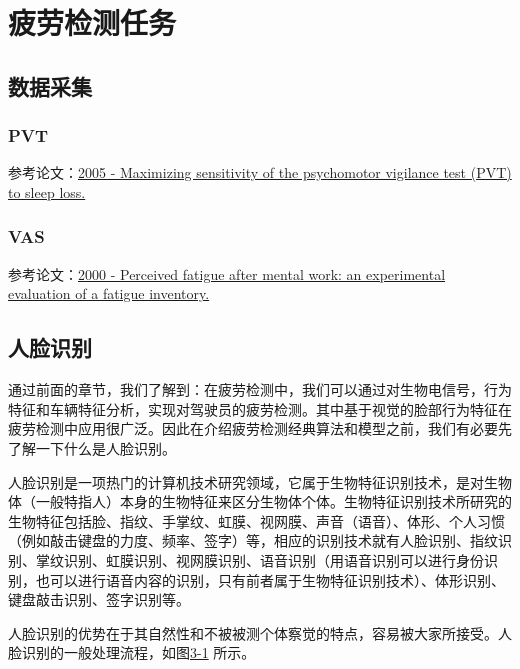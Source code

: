 \chapter{疲劳检测任务}

\section{数据采集}

\subsection{PVT}

参考论文：\href{https://xueshu.baidu.com/usercenter/paper/show?paperid=430fa0094230e7e14ad6ff778e61ebc6&site=xueshu_se&hitarticle=1}{2005 - Maximizing sensitivity of the psychomotor vigilance test (PVT) to sleep loss.}

\subsection{VAS}

参考论文：\href{https://xueshu.baidu.com/usercenter/paper/show?paperid=e67a15e52d71a9730b1205d21f73b239&site=xueshu_se}{2000 - Perceived fatigue after mental work: an experimental evaluation of a fatigue inventory.}

\section{人脸识别}

通过前面的章节，我们了解到：在疲劳检测中，我们可以通过对生物电信号，行为特征和车辆特征分析，实现对驾驶员的疲劳检测。其中基于视觉的脸部行为特征在疲劳检测中应用很广泛。因此在介绍疲劳检测经典算法和模型之前，我们有必要先了解一下什么是人脸识别。

人脸识别是一项热门的计算机技术研究领域，它属于生物特征识别技术，是对生物体（一般特指人）本身的生物特征来区分生物体个体。生物特征识别技术所研究的生物特征包括脸、指纹、手掌纹、虹膜、视网膜、声音（语音）、体形、个人习惯（例如敲击键盘的力度、频率、签字）等，相应的识别技术就有人脸识别、指纹识别、掌纹识别、虹膜识别、视网膜识别、语音识别（用语音识别可以进行身份识别，也可以进行语音内容的识别，只有前者属于生物特征识别技术）、体形识别、键盘敲击识别、签字识别等。

人脸识别的优势在于其自然性和不被被测个体察觉的特点，容易被大家所接受。人脸识别的一般处理流程，如图\href{figure:3-1}{3-1} 所示。

